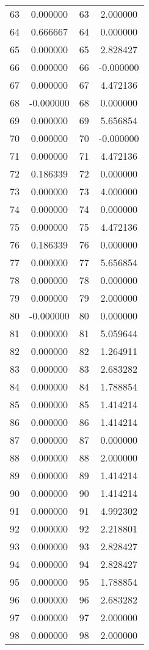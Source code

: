 \documentclass[12pt]{article}
\begin{document}
\begin{longtable}{@{}cccc@{}}
63 & 0.000000 & 63 & 2.000000 \\
64 & 0.666667 & 64 & 0.000000 \\
65 & 0.000000 & 65 & 2.828427 \\
66 & 0.000000 & 66 & -0.000000 \\
67 & 0.000000 & 67 & 4.472136 \\
68 & -0.000000 & 68 & 0.000000 \\
69 & 0.000000 & 69 & 5.656854 \\
70 & 0.000000 & 70 & -0.000000 \\
71 & 0.000000 & 71 & 4.472136 \\
72 & 0.186339 & 72 & 0.000000 \\
73 & 0.000000 & 73 & 4.000000 \\
74 & 0.000000 & 74 & 0.000000 \\
75 & 0.000000 & 75 & 4.472136 \\
76 & 0.186339 & 76 & 0.000000 \\
77 & 0.000000 & 77 & 5.656854 \\
78 & 0.000000 & 78 & 0.000000 \\
79 & 0.000000 & 79 & 2.000000 \\
80 & -0.000000 & 80 & 0.000000 \\
81 & 0.000000 & 81 & 5.059644 \\
82 & 0.000000 & 82 & 1.264911 \\
83 & 0.000000 & 83 & 2.683282 \\
84 & 0.000000 & 84 & 1.788854 \\
85 & 0.000000 & 85 & 1.414214 \\
86 & 0.000000 & 86 & 1.414214 \\
87 & 0.000000 & 87 & 0.000000 \\
88 & 0.000000 & 88 & 2.000000 \\
89 & 0.000000 & 89 & 1.414214 \\
90 & 0.000000 & 90 & 1.414214 \\
91 & 0.000000 & 91 & 4.992302 \\
92 & 0.000000 & 92 & 2.218801 \\
93 & 0.000000 & 93 & 2.828427 \\
94 & 0.000000 & 94 & 2.828427 \\
95 & 0.000000 & 95 & 1.788854 \\
96 & 0.000000 & 96 & 2.683282 \\
97 & 0.000000 & 97 & 2.000000 \\
98 & 0.000000 & 98 & 2.000000 \\

\end{longtable}
\end{document}
